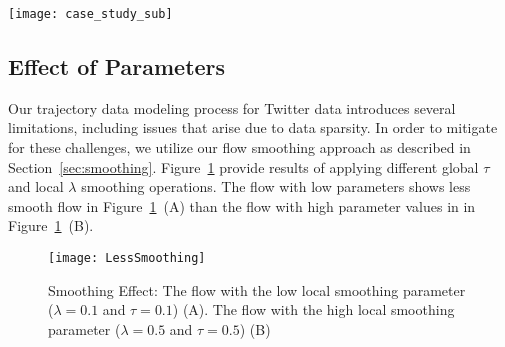 \begin{figure*}[tb]
	\centering
	\texttt{[image: case\_study\_sub]}
	\caption{The probability flow zoom in around the Lincoln tunnel. Less taxi traffic utilizing the tunnel during the morning (left) and evening (right) rush hours. However, there is a higher predicted flow during lunch commute hours (middle).}
	\label{fig:case_study_taxi_sub}
\end{figure*}


\subsection{Effect of Parameters}

Our trajectory data modeling process for Twitter data introduces several limitations, including issues that arise due to data sparsity. 
In order to mitigate for these challenges, we utilize our flow smoothing approach as described in Section~\ref{sec:smoothing}.
Figure~\ref{fig:LessSmoothing} provide results of applying different global $\tau$ and local $\lambda$ smoothing operations.
The flow with low parameters shows less smooth flow in Figure~\ref{fig:LessSmoothing}~(A) than the flow with high parameter values in in Figure~\ref{fig:LessSmoothing}~(B).

\begin{figure}[tbh]
	\centering
	\texttt{[image: LessSmoothing]}
	\caption{Smoothing Effect: The flow with the low local smoothing parameter ($\lambda = 0.1$ and $\tau = 0.1$) (A). The flow with the high local smoothing parameter ($\lambda = 0.5$ and $\tau = 0.5$) (B)}
	\label{fig:LessSmoothing}
\end{figure}
